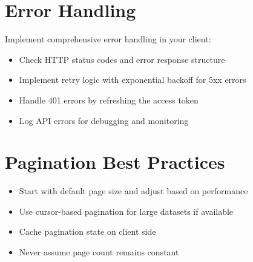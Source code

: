 \documentclass[12pt,a4paper]{report}
\begin{document}
\section{Error Handling}

Implement comprehensive error handling in your client:

\begin{itemize}
    \item Check HTTP status codes and error response structure
    \item Implement retry logic with exponential backoff for 5xx errors
    \item Handle 401 errors by refreshing the access token
    \item Log API errors for debugging and monitoring
\end{itemize}

\section{Pagination Best Practices}

\begin{itemize}
    \item Start with default page size and adjust based on performance
    \item Use cursor-based pagination for large datasets if available
    \item Cache pagination state on client side
    \item Never assume page count remains constant
\end{itemize}
\end{document}
